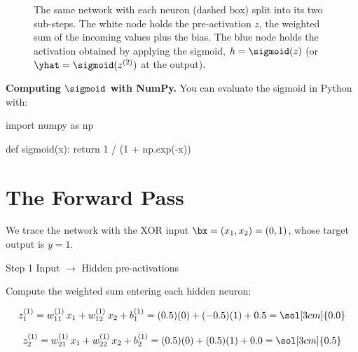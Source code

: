 \documentclass[12pt, a4paper]{article}
\begin{document}
\begin{figure}[H]
  \caption{The same network with each neuron (dashed box) split into its two
    sub-steps. The white node holds the pre-activation $z$, the weighted sum
    of the incoming values plus the bias. The blue node holds the activation
    obtained by applying the sigmoid, $h = \sigmoid(z)$ (or $\yhat = \sigmoid(z^{(2)})$
    at the output).}
  \label{fig:forward-pass-z}
\end{figure}

\begin{notebox}
  \textbf{Computing $\sigmoid$ with NumPy.}
  You can evaluate the sigmoid in Python with:
\end{notebox}
\begin{codebox}
  import numpy as np

  def sigmoid(x):
  return 1 / (1 + np.exp(-x))
\end{codebox}

\section{The Forward Pass}

We trace the network with the XOR input $\bx = (x_1, x_2) = (0, 1)$,
whose target output is $y = 1$.

\begin{stepbox}{Step 1 \quad Input $\to$ Hidden pre-activations}

  Compute the weighted sum entering each hidden neuron:

  \[
    z^{(1)}_1
    = w^{(1)}_{11}\,x_1 + w^{(1)}_{12}\,x_2 + b^{(1)}_1
    = (0.5)(0) + (-0.5)(1) + 0.5
    = \sol[3cm]{0.0}
  \]

  \[
    z^{(1)}_2
    = w^{(1)}_{21}\,x_1 + w^{(1)}_{22}\,x_2 + b^{(1)}_2
    = (0.5)(0) + (0.5)(1) + 0.0
    = \sol[3cm]{0.5}
  \]
\end{stepbox}
\end{document}
